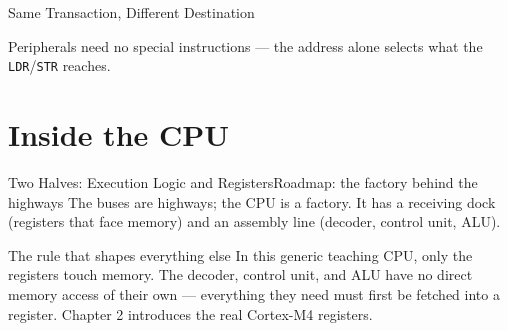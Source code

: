 \documentclass[9pt,aspectratio=169,xcolor=table]{beamer}
\begin{document}
\begin{frame}{Same Transaction, Different Destination}
    \vspace{4mm}
    \begin{center}
    \end{center}

    \vspace{1mm}
    {\footnotesize Peripherals need \alert{no special instructions} ---
    the address alone selects what the \texttt{LDR}/\texttt{STR} reaches.}
\end{frame}

\section{Inside the CPU}

\begin{frame}{Two Halves: Execution Logic and Registers}{Roadmap: the factory behind the highways}
    \leavevmode
    {\small The buses are highways; the CPU is a \alert{factory}. It has a
    \alert{receiving dock} (registers that face memory) and an
    \alert{assembly line} (decoder, control unit, ALU).}

    \vspace{3mm}
    \begin{center}
    \end{center}

    \vspace{3mm}
    \begin{block}{The rule that shapes everything else}
        In this generic teaching CPU, \alert{only the registers touch memory.}
        The decoder, control unit, and ALU have \alert{no direct memory
        access} of their own --- everything they need must first be
        fetched into a register. Chapter 2 introduces the real
        Cortex-M4 registers.
    \end{block}
\end{frame}
\end{document}
